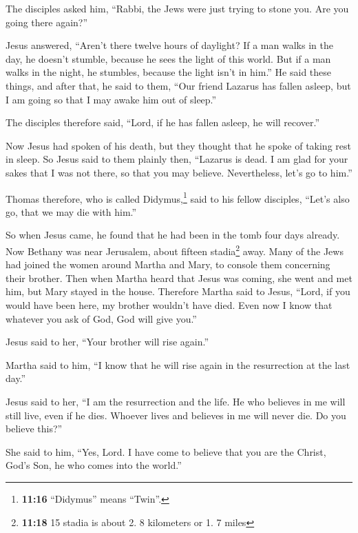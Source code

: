  The disciples asked him, ``Rabbi, the Jews were just
trying to stone you. Are you going there again?''

 Jesus answered, ``Aren't there twelve hours of daylight?
If a man walks in the day, he doesn't stumble, because he sees the light
of this world.  But if a man walks in the night, he
stumbles, because the light isn't in him.''  He said
these things, and after that, he said to them, ``Our friend Lazarus has
fallen asleep, but I am going so that I may awake him out of sleep.''

 The disciples therefore said, ``Lord, if he has fallen
asleep, he will recover.''

 Now Jesus had spoken of his death, but they thought that
he spoke of taking rest in sleep.  So Jesus said to them
plainly then, ``Lazarus is dead.  I am glad for your
sakes that I was not there, so that you may believe. Nevertheless, let's
go to him.''

 Thomas therefore, who is called Didymus,\footnote{\textbf{11:16}
  ``Didymus'' means ``Twin''.} said to his fellow disciples, ``Let's
also go, that we may die with him.''

 So when Jesus came, he found that he had been in the
tomb four days already.  Now Bethany was near Jerusalem,
about fifteen stadia\footnote{\textbf{11:18} 15 stadia is about 2. 8
  kilometers or 1. 7 miles} away.  Many of the Jews had
joined the women around Martha and Mary, to console them concerning
their brother.  Then when Martha heard that Jesus was
coming, she went and met him, but Mary stayed in the house.
 Therefore Martha said to Jesus, ``Lord, if you would
have been here, my brother wouldn't have died.  Even now
I know that whatever you ask of God, God will give you.''

 Jesus said to her, ``Your brother will rise again.''

 Martha said to him, ``I know that he will rise again in
the resurrection at the last day.''

 Jesus said to her, ``I am the resurrection and the life.
He who believes in me will still live, even if he dies. 
Whoever lives and believes in me will never die. Do you believe this?''

 She said to him, ``Yes, Lord. I have come to believe
that you are the Christ, God's Son, he who comes into the world.''


